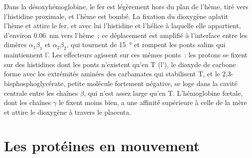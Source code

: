 \begin{proposition}\label{prop:b3:structural-biology:mechanism}
Dans la désoxyhémoglobine, le fer est légèrement hors du plan de
l'hème, tiré vers l'histidine proximale, et l'hème est bombé. La
fixation du dioxygène aplatit l'hème et attire le fer, et avec lui
l'histidine et l'hélice à laquelle elle appartient, d'environ
\qty{0.06}{nm} vers l'hème~; ce déplacement est amplifié à l'interface
entre les dimères $\alpha_{1}\beta_{1}$ et $\alpha_{2}\beta_{2}$, qui
tournent de \qty{15}{\degree} et rompent les ponts salins qui
maintiennent l'. Les effecteurs agissent sur ces mêmes ponts~:
les protons se fixent sur des histidines dont les ponts n'existent
qu'en T (l'), le dioxyde de carbone forme avec les extrémités
aminées des carbamates qui stabilisent T, et le
2,3-bisphosphoglycérate, petite molécule fortement négative, se loge
dans la cavité centrale entre les chaînes $\beta$, qui n'est assez
large qu'en T. L'hémoglobine fœtale, dont les chaînes $\gamma$ le
fixent moins bien, a une affinité supérieure à celle de la mère et
attire le dioxygène à travers le placenta.
\end{proposition}

\section{Les protéines en mouvement}

